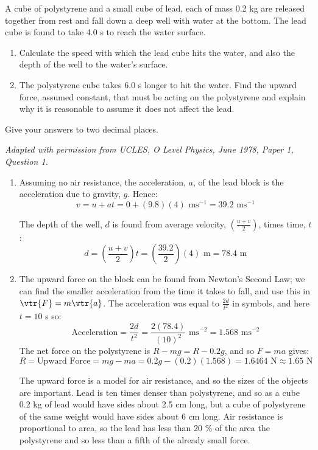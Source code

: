 
\begin{problem}[O1978PIIQ1a]
{A cube of polystyrene and a small cube of lead, each of mass 0.2 kg are released together from rest and fall down a deep well with water at the bottom. The lead cube is found to take 4.0 s to reach the water surface.
\begin{enumerate}
	\item Calculate the speed with which the lead cube hits the water, and also the depth of the well to the water's surface. 
	\item The polystyrene cube takes 6.0 s longer to hit the water. Find the upward force, assumed constant, that must be acting on the polystyrene and explain why it is reasonable to assume it does not affect the lead. 
\end{enumerate}
Give your answers to two decimal places.} 
{\textit{Adapted with permission from UCLES, O Level Physics, June 1978, Paper 1, Question 1.}}
{\begin{enumerate}
\item Assuming no air resistance, the acceleration, $a$, of the lead block is the acceleration due to gravity, $g$. Hence:
\begin{equation*}
v = u + at = 0 + (9.8)(4) \textrm{ ms}^{-1} = 39.2 \textrm{ ms}^{-1} 
\end{equation*}

The depth of the well, $d$ is found from average velocity, $\left(\frac{u + v}{2}\right)$, times time, $t$:
\begin{equation*} d = \left(\frac{u + v}{2}\right)t = \left(\frac{39.2}{2}\right)(4) \textrm{ m} = 78.4 \textrm{ m} \end{equation*}
\item The upward force on the block can be found from Newton's Second Law; we can find the smaller acceleration from the time it takes to fall, and use this in $\vtr{F} = m\vtr{a}$. The acceleration was equal to $\frac{2d}{t^{2}}$ in symbols, and here $t = 10$ s so:
\begin{equation*} \textrm{Acceleration} = \frac{2d}{t^{2}} = \frac{2(78.4)}{(10)^{2}} \textrm{ ms}^{-2} = 1.568 \textrm{ ms}^{-2} \end{equation*}
The net force on the polystyrene is $R - mg = R - 0.2g$, and so $F = ma$ gives:
\begin{equation*} R = \textrm{Upward Force} = mg - ma = 0.2g - (0.2)(1.568) = 1.6464 \textrm{ N} \approx 1.65 \textrm{ N} \end{equation*}

The upward force is a model for air resistance, and so the sizes of the objects are important. Lead is ten times denser than polystyrene, and so as a cube 0.2 kg of lead would have sides about 2.5 cm long, but a cube of polystyrene of the same weight would have sides about 6 cm long. Air resistance is proportional to area, so the lead has less than 20 \% of the area the polystyrene and so less than a fifth of the already small force.
\end{enumerate}
}
\end{problem}